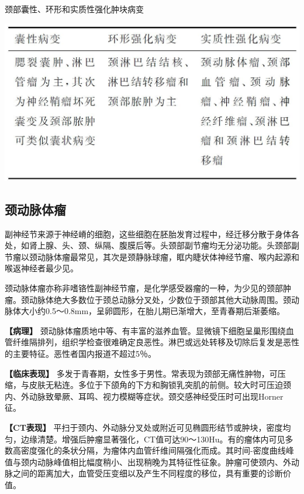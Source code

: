 \begin{table}[htbp]
\centering
\caption{颈部囊性、环形和实质性强化肿块病变}
\label{tab8-1}
\includegraphics[width=\textwidth,height=\textheight,keepaspectratio]{./images/Image00170.jpg}
\end{table}

\subsection{颈动脉体瘤}

副神经节来源于神经嵴的细胞，这些细胞在胚胎发育过程中，经迁移分散于身体各处，如肾上腺、头、颈、纵隔、腹膜后等。头颈部副节瘤均无分泌功能。头颈部副节瘤以颈动脉体瘤最常见，其次是颈静脉球瘤，眶内睫状体神经节瘤、喉内起源和喉返神经者最少见。

颈动脉体瘤亦称非嗜铬性副神经节瘤，是化学感受器瘤的一种，为少见的颈部肿瘤。颈动脉体绝大多数位于颈总动脉分叉处，少数位于颈部其他大动脉周围。颈动脉体大小约0.5～0.8mm，呈卵圆形，在胎儿期已渐增大，至青春期后渐萎缩。

\textbf{【病理】}
颈动脉体瘤质地中等、有丰富的滋养血管。显微镜下细胞呈巢形围绕血管纤维隔排列，组织学检查很难确定良恶性。淋巴或远处转移及切除后复发是恶性的主要特征。恶性者国内报道不超过5％。

\textbf{【临床表现】}
多发于青春期，女性多于男性。常表现为颈部无痛性肿物，可压缩，与皮肤无粘连。多位于下颌角的下方和胸锁乳突肌的前侧。较大时可压迫颈内、外动脉致晕厥、耳鸣、视力模糊等症状。颈交感神经受压时可出现Horner征。

\textbf{【CT表现】}
平扫于颈内、外动脉分叉处或附近可见椭圆形结节或肿块，密度均匀，边缘清楚。增强后肿瘤显著强化，CT值可达90～130Hu。有的瘤体内可见多数高密度强化的条状分隔，为瘤体内血管纤维间隔强化而成。其时间-密度曲线峰值与颈内动脉峰值相比幅度稍小、出现稍晚为其特征性征象。肿瘤可使颈内、外动脉之间的距离加大，血管受压变细以及产生不同程度的移位，具有重要的诊断价值。

